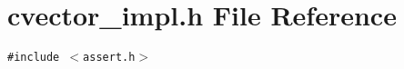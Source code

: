 \section{cvector\_\-impl.h File Reference}
\label{cvector__impl_8h}
{\tt \#include $<$assert.h$>$}\par
